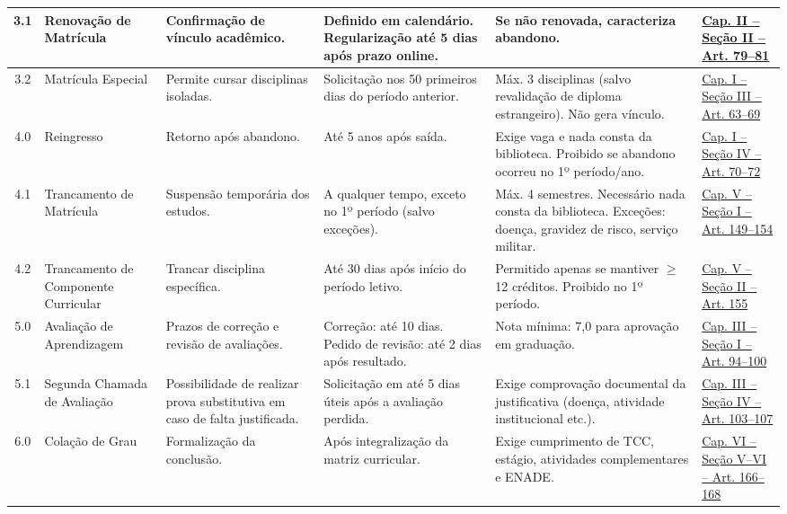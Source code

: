 \documentclass[authoryear]{elsarticle}
\begin{document}
\begin{longtable}{|c|p{3cm}|p{3cm}|p{3.5cm}|p{3.5cm}|p{2cm}|}
	\hline
	3.1 & Renovação de Matrícula & Confirmação de vínculo acadêmico. & Definido em calendário. Regularização até 5 dias após prazo online. & Se não renovada, caracteriza abandono. & \href{https://github.com/JonathaCosta-IA/CCECA/blob/main/02_Rod_atualizado1.pdf}{Cap. II – Seção II – Art. 79--81} \\
	\hline
	3.2 & Matrícula Especial & Permite cursar disciplinas isoladas. & Solicitação nos 50 primeiros dias do período anterior. & Máx. 3 disciplinas (salvo revalidação de diploma estrangeiro). Não gera vínculo. & \href{https://github.com/JonathaCosta-IA/CCECA/blob/main/02_Rod_atualizado1.pdf}{Cap. I – Seção III – Art. 63--69} \\
	\hline
	4.0 & Reingresso & Retorno após abandono. & Até 5 anos após saída. & Exige vaga e nada consta da biblioteca. Proibido se abandono ocorreu no 1º período/ano. & \href{https://github.com/JonathaCosta-IA/CCECA/blob/main/02_Rod_atualizado1.pdf}{Cap. I – Seção IV – Art. 70--72} \\
	\hline
	4.1 & Trancamento de Matrícula & Suspensão temporária dos estudos. & A qualquer tempo, exceto no 1º período (salvo exceções). & Máx. 4 semestres. Necessário nada consta da biblioteca. Exceções: doença, gravidez de risco, serviço militar. & \href{https://github.com/JonathaCosta-IA/CCECA/blob/main/02_Rod_atualizado1.pdf}{Cap. V – Seção I – Art. 149--154} \\
	\hline
	4.2 & Trancamento de Componente Curricular & Trancar disciplina específica. & Até 30 dias após início do período letivo. & Permitido apenas se mantiver $\geq$12 créditos. Proibido no 1º período. & \href{https://github.com/JonathaCosta-IA/CCECA/blob/main/02_Rod_atualizado1.pdf}{Cap. V – Seção II – Art. 155} \\
	\hline
	5.0 & Avaliação de Aprendizagem & Prazos de correção e revisão de avaliações. & Correção: até 10 dias. Pedido de revisão: até 2 dias após resultado. & Nota mínima: 7,0 para aprovação em graduação. & \href{https://github.com/JonathaCosta-IA/CCECA/blob/main/02_Rod_atualizado1.pdf}{Cap. III – Seção I – Art. 94--100} \\
	\hline
	5.1 & Segunda Chamada de Avaliação & Possibilidade de realizar prova substitutiva em caso de falta justificada. & Solicitação em até 5 dias úteis após a avaliação perdida. & Exige comprovação documental da justificativa (doença, atividade institucional etc.). & \href{https://github.com/JonathaCosta-IA/CCECA/blob/main/02_Rod_atualizado1.pdf}{Cap. III – Seção IV – Art. 103--107} \\
	\hline
	6.0 & Colação de Grau & Formalização da conclusão. & Após integralização da matriz curricular. & Exige cumprimento de TCC, estágio, atividades complementares e ENADE. & \href{https://github.com/JonathaCosta-IA/CCECA/blob/main/02_Rod_atualizado1.pdf}{Cap. VI – Seção V--VI – Art. 166--168} \\
	\hline
	

\end{longtable}
\end{document}
